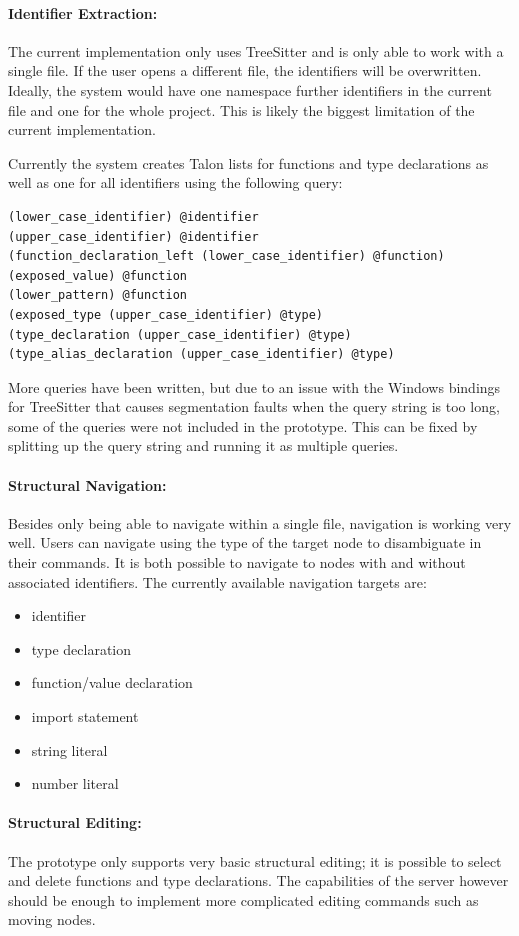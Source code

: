 \documentclass[../thesis.tex]{subfiles}
\begin{document}
\paragraph{Identifier Extraction:}
The current implementation only uses TreeSitter and is only able to work with a single file.
If the user opens a different file, the identifiers will be overwritten.
Ideally, the system would have one namespace further identifiers in the current file
and one for the whole project.
This is likely the biggest limitation of the current implementation.

Currently the system creates Talon lists for functions and type declarations as well as one for all identifiers using the following query:
\begin{verbatim}
(lower_case_identifier) @identifier 
(upper_case_identifier) @identifier
(function_declaration_left (lower_case_identifier) @function)
(exposed_value) @function
(lower_pattern) @function
(exposed_type (upper_case_identifier) @type)
(type_declaration (upper_case_identifier) @type)
(type_alias_declaration (upper_case_identifier) @type)
\end{verbatim}
More queries have been written, but due to an issue with the Windows bindings for TreeSitter
that causes segmentation faults when the query string is too long, some of the queries
were not included in the prototype.
This can be fixed by splitting up the query string and running it as multiple queries.

\paragraph{Structural Navigation:}
Besides only being able to navigate within a single file, navigation is working very well.
Users can navigate using the type of the target node to disambiguate in their commands.
It is both possible to navigate to nodes with and without associated identifiers.
The currently available navigation targets are:
\begin{itemize}
    \item identifier
    \item type declaration
    \item function/value declaration
    \item import statement
    \item string literal
    \item number literal
\end{itemize}


\paragraph{Structural Editing:}
The prototype only supports very basic structural editing;
it is possible to select and delete functions and type declarations.
The capabilities of the server however should be enough to implement
more complicated editing commands such as moving nodes.
\end{document}
